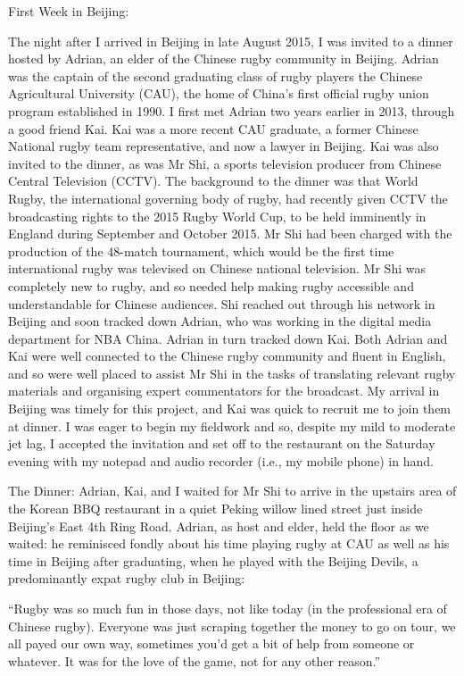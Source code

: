 First Week in Beijing:

The night after I arrived in Beijing in late August 2015, I was invited to a dinner hosted by Adrian, an elder of the Chinese rugby community in Beijing.  Adrian was the captain of the second graduating class of rugby players the Chinese Agricultural University (CAU), the home of China's first official rugby union program established in 1990.  I first met Adrian two years earlier in 2013, through a good friend Kai. Kai was  a more recent CAU graduate, a former Chinese National rugby team representative, and now a lawyer in Beijing.  Kai was also invited to the dinner, as was Mr Shi, a sports television producer from Chinese Central Television (CCTV).  The background to the dinner was that World Rugby, the international governing body of rugby, had recently given CCTV the broadcasting rights to the 2015 Rugby World Cup, to be held imminently in England during September and October 2015.  Mr Shi had been charged with the production of the 48-match tournament, which would be the first time international rugby was televised on Chinese national television.  Mr Shi was completely new to rugby, and so needed help making rugby accessible and understandable for Chinese audiences.  Shi reached out through his network in Beijing and soon tracked down Adrian, who was working in the digital media department for NBA China. Adrian in turn tracked down Kai. Both Adrian and Kai were well connected to the Chinese rugby community and fluent in English, and so were well placed to assist Mr Shi in the tasks of translating relevant rugby materials and organising expert commentators for the broadcast.  My arrival in Beijing was timely for this project, and Kai was quick to recruit me to join them at dinner.  I was eager to begin my fieldwork and so, despite my mild to moderate jet lag, I accepted the invitation and set off to the restaurant on the Saturday evening with my notepad and audio recorder (i.e., my mobile phone) in hand.

The Dinner:
Adrian, Kai, and I waited for Mr Shi to arrive in the upstairs area of the Korean BBQ restaurant in a quiet Peking willow lined street just inside Beijing's East 4th Ring Road.  Adrian, as host and elder, held the floor as we waited: he reminisced fondly about his time playing rugby at CAU as well as his time in Beijing after graduating, when he played with the Beijing Devils, a predominantly expat rugby club in Beijing:

  ``Rugby was so much fun in those days, not like today (in the professional era of Chinese rugby).  Everyone was just scraping together the money to go on tour, we all payed our own way, sometimes you'd get a bit of help from someone or whatever. It was for the love of the game, not for any other reason.''

